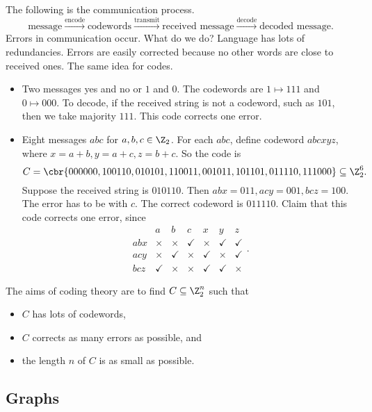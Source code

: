 The following is the communication process.
$$ \text{message} \xrightarrow{\text{encode}} \text{codewords} \xrightarrow{\text{transmit}} \text{received message} \xrightarrow{\text{decode}} \text{decoded message}. $$
Errors in communication occur. What do we do? Language has lots of redundancies. Errors are easily corrected because no other words are close to received ones. The same idea for codes.

\begin{example*}
\hfill
\begin{itemize}
\item Two messages yes and no or $ 1 $ and $ 0 $. The codewords are $ 1 \mapsto 111 $ and $ 0 \mapsto 000 $. To decode, if the received string is not a codeword, such as $ 101 $, then we take majority $ 111 $. This code corrects one error.
\item Eight messages $ abc $ for $ a, b, c \in \Z_2 $. For each $ abc $, define codeword $ abcxyz $, where $ x = a + b, y = a + c, z = b + c $. So the code is
$$ C = \cbr{000000, 100110, 010101, 110011, 001011, 101101, 011110, 111000} \subseteq \Z_2^6. $$
Suppose the received string is $ 010110 $. Then $ abx = 011, acy = 001, bcz = 100 $. The error has to be with $ c $. The correct codeword is $ 011110 $. Claim that this code corrects one error, since
$$
\begin{array}{c|cccccc}
& a & b & c & x & y & z \\
\hline
abx & \times & \times & \checkmark & \times & \checkmark & \checkmark \\
acy & \times & \checkmark & \times & \checkmark & \times & \checkmark \\
bcz & \checkmark & \times & \times & \checkmark & \checkmark & \times
\end{array}.
$$
\end{itemize}
\end{example*}

The aims of coding theory are to find $ C \subseteq \Z_2^n $ such that
\begin{itemize}
\item $ C $ has lots of codewords,
\item $ C $ corrects as many errors as possible, and
\item the length $ n $ of $ C $ is as small as possible.
\end{itemize}

\pagebreak

\subsection{Graphs}

